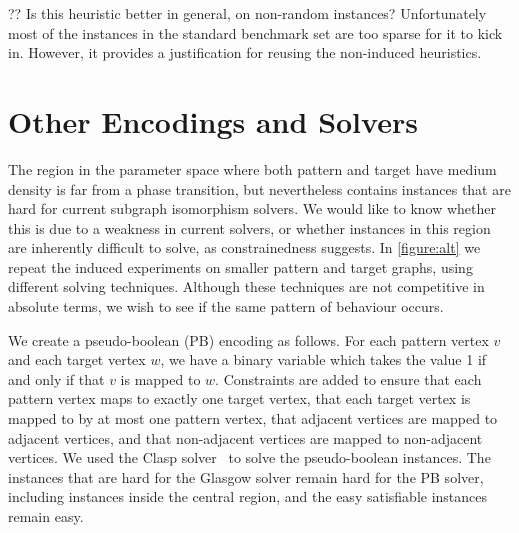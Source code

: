 \documentclass[letterpaper]{article}
\begin{document}
?? Is this heuristic better in general, on non-random instances? Unfortunately most of the instances
in the standard benchmark set are too sparse for it to kick in. However, it provides a justification
for reusing the non-induced heuristics.

\section{Other Encodings and Solvers}

\begin{figure*}[t]
    \setlength{\abovecaptionskip}{0pt}
    
    \caption{Behaviour of other solvers on the induced variant on smaller graphs, shown in the style of
        \cref{figure:non-induced}. The second row shows the number of search nodes used by the
    Glasgow algorithm, the third row shows the number of decisions made by the Clasp pseudo-boolean
solver, and the fourth row shows the number of search nodes used by BBMC on the clique
encoding.}\label{figure:alt}
\end{figure*}

The region in the parameter space where both pattern and target have medium density is far from a
phase transition, but nevertheless contains instances that are hard for current subgraph isomorphism
solvers. We would like to know whether this is due to a weakness in current solvers, or whether
instances in this region are inherently difficult to solve, as constrainedness suggests. In
\cref{figure:alt} we repeat the induced experiments on smaller pattern and target graphs, using
different solving techniques.  Although these techniques are not competitive in absolute terms, we
wish to see if the same pattern of behaviour occurs.

We create a pseudo-boolean (PB) encoding as follows. For each pattern vertex $v$ and each target
vertex $w$, we have a binary variable which takes the value 1 if and only if that $v$ is mapped to
$w$.  Constraints are added to ensure that each pattern vertex maps to exactly one target vertex,
that each target vertex is mapped to by at most one pattern vertex, that adjacent vertices are
mapped to adjacent vertices, and that non-adjacent vertices are mapped to non-adjacent vertices. We
used the Clasp solver~\citep{gekakaosscsc11a} to solve the pseudo-boolean instances. The instances
that are hard for the Glasgow solver remain hard for the PB solver, including instances inside the
central region, and the easy satisfiable instances remain easy.
\end{document}
